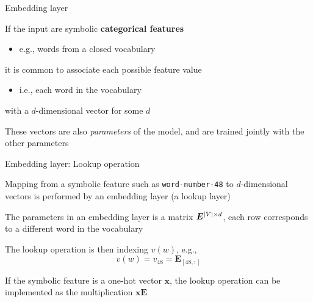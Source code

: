 \documentclass[12pt,aspectratio=169,handout]{beamer}
\begin{document}
\begin{frame}{Embedding layer}
	
	If the input are symbolic \textbf{categorical features}
	\begin{itemize}
		\item e.g., words from a closed vocabulary
	\end{itemize}
	it is common to associate each possible feature value
	\begin{itemize}
		\item i.e., each word in the vocabulary
	\end{itemize}
	with a $d$-dimensional vector for some $d$
	
	\bigskip
	
	These vectors are also \emph{parameters} of the model, and are trained jointly with the other parameters
	
\end{frame}

\begin{frame}{Embedding layer: Lookup operation}
	
	Mapping from a symbolic feature such as \texttt{word-number-48} to $d$-dimensional vectors is performed by an embedding layer (a lookup layer)
	
	The parameters in an embedding layer is a matrix $\bm{E}^{\abs{V} \times d}$, each row corresponds to a different word in the vocabulary
	
	The lookup operation is then indexing $v(w)$, e.g.,
	$$v(w) = v_{48} = \bm{E}_{[48,:]}$$
	
	If the symbolic feature is a one-hot vector $\bm{x}$, the lookup operation can be implemented as the multiplication $\bm{x} \bm{E}$
	
\end{frame}
\end{document}
